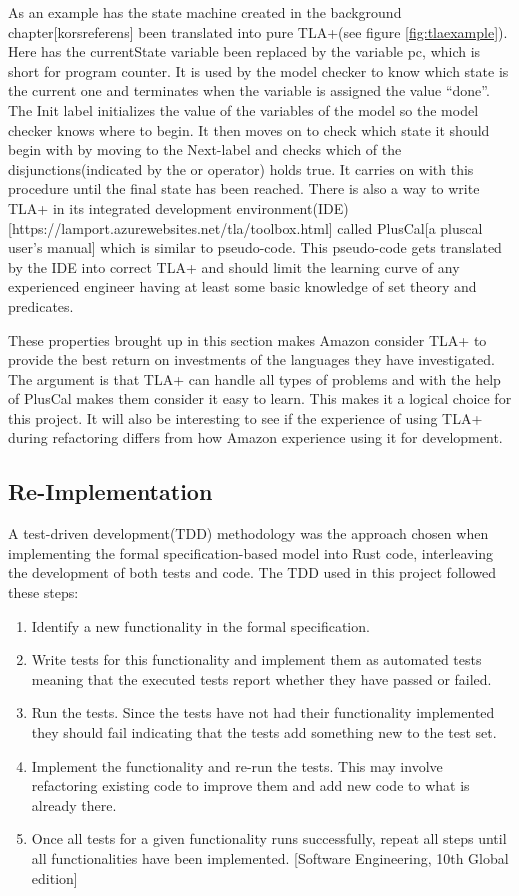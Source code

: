 \documentclass{article}
\begin{document}
As an example has the state machine created in the background chapter[korsreferens] been translated into pure TLA+(see figure \ref{fig:tlaexample}).
Here has the currentState variable been replaced by the variable pc, which is short for program counter. It is used by the model checker to know which state is the current one and terminates when the variable is assigned the value “done”. The Init label initializes the value of the variables of the model so the model checker knows where to begin. It then moves on to check which state it should begin with by moving to the Next-label and checks which of the disjunctions(indicated by the or operator) holds true. It carries on with this procedure until the final state has been reached. There is also a way to write TLA+ in its integrated development environment(IDE)[https://lamport.azurewebsites.net/tla/toolbox.html] called PlusCal[a pluscal user’s manual] which is similar to pseudo-code. This pseudo-code gets translated by the IDE into correct TLA+ and should limit the learning curve of any experienced engineer having at least some basic knowledge of set theory and predicates. 

These properties brought up in this section makes Amazon consider TLA+ to provide the best return on investments of the languages they have investigated. The argument is that TLA+ can handle all types of problems and with the help of PlusCal makes them consider it easy to learn. This makes it a logical choice for this project. It will also be interesting to see if the experience of using TLA+ during refactoring differs from how Amazon experience using it for development.

\subsection{Re-Implementation}\label{reimpl}
A test-driven development(TDD) methodology was the approach chosen when implementing the formal specification-based model into Rust code, interleaving the development of both tests and code. The TDD used in this project followed these steps:


\begin{enumerate}
  \item Identify a new functionality in the formal specification. 
  \item Write tests for this functionality and implement them as automated tests meaning that the executed tests report whether they have passed or failed.
  \item Run the tests. Since the tests have not had their functionality implemented they should fail indicating that the tests add something new to the test set.
  \item Implement the functionality and re-run the tests. This may involve refactoring existing code to improve them and add new code to what is already there.
  \item Once all tests for a given functionality runs successfully, repeat all steps until all functionalities have been implemented. [Software Engineering, 10th Global edition]

\end{enumerate}
\end{document}
